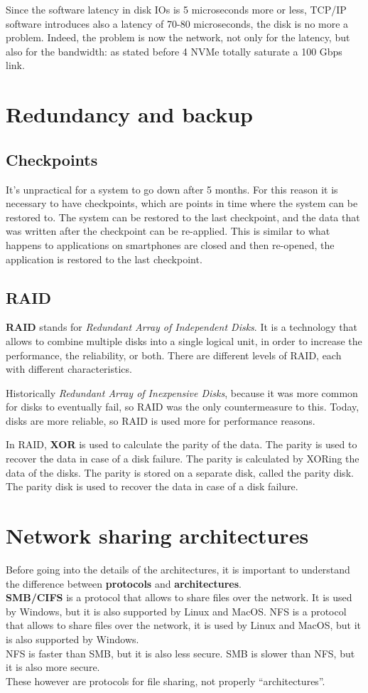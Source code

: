 Since the software latency in disk IOs is 5 microseconds more or less,
TCP/IP software introduces also a latency of 70-80 microseconds, the disk is
no more a problem. Indeed, the problem is now the network, not only for the
latency, but also for the bandwidth: as stated before 4 NVMe totally saturate a 100 Gbps
link.

\section{Redundancy and backup}
\subsection{Checkpoints}
It's unpractical for a system to go down after 5 months. For this reason it is necessary to have checkpoints, which are points in time where the system can be restored to. The system can be restored to the last checkpoint, and the data that was written after the checkpoint can be re-applied. This is similar to what happens to applications on smartphones are closed and then re-opened, the application is restored to the last checkpoint.

\subsection{RAID}
\textbf{RAID} stands for \textit{Redundant Array of Independent Disks}. It is a technology that allows to combine multiple disks into a single logical unit, in order to increase the performance, the reliability, or both. There are different levels of RAID, each with different characteristics.

Historically \textit{Redundant Array of Inexpensive Disks}, because it was more common for disks to eventually fail, so RAID was the only countermeasure to this. Today, disks are more reliable, so RAID is used more for performance reasons.

In RAID, \textbf{XOR} is used to calculate the parity of the data. The parity is used to recover the data in case of a disk failure. The parity is calculated by XORing the data of the disks. The parity is stored on a separate disk, called the parity disk. The parity disk is used to recover the data in case of a disk failure.


\section{Network sharing architectures}
Before going into the details of the architectures, it is important to understand the difference between \textbf{protocols} and \textbf{architectures}.\\
\textbf{SMB/CIFS} is a protocol that allows to share files over the network. It is used by Windows, but it is also supported by Linux and MacOS. NFS is a protocol that allows to share files over the network, it is used by Linux and MacOS, but it is also supported by Windows.\\
NFS is faster than SMB, but it is also less secure. SMB is slower than NFS, but it is also more secure.\\
These however are protocols for file sharing, not properly ``architectures''.

